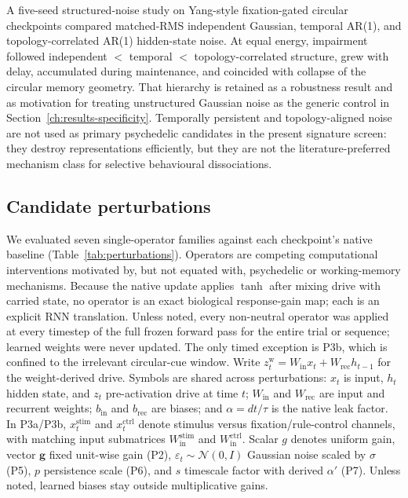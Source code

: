 A five-seed structured-noise study on Yang-style fixation-gated circular
checkpoints compared matched-RMS independent Gaussian, temporal AR(1), and
topology-correlated AR(1) hidden-state noise. At equal energy, impairment
followed independent $<$ temporal $<$ topology-correlated structure, grew with
delay, accumulated during maintenance, and coincided with collapse of the
circular memory geometry. That hierarchy is retained as a robustness result
and as motivation for treating unstructured Gaussian noise as the generic
control in Section~\ref{ch:results-specificity}. Temporally persistent and
topology-aligned noise are not used as primary psychedelic candidates in the
present signature screen: they destroy representations efficiently, but they
are not the literature-preferred mechanism class for selective behavioural
dissociations.

\subsection{Candidate perturbations}

We evaluated seven single-operator families against each checkpoint's native
baseline (Table~\ref{tab:perturbations}). Operators are competing computational
interventions motivated by, but not equated with, psychedelic or working-memory
mechanisms. Because the native update applies $\tanh$ after mixing drive with
carried state, no operator is an exact biological response-gain map; each is an
explicit RNN translation. Unless noted, every non-neutral operator was applied
at every timestep of the full frozen forward pass for the entire trial or
sequence; learned weights were never updated. The only timed exception is P3b,
which is confined to the irrelevant circular-cue window. Write
$z_t^{\mathrm{w}}=W_{\mathrm{in}}x_t+W_{\mathrm{rec}}h_{t-1}$ for the
weight-derived drive. Symbols are shared across perturbations:
$x_t$ is input, $h_t$ hidden state, and $z_t$ pre-activation drive at time
$t$; $W_{\mathrm{in}}$ and $W_{\mathrm{rec}}$ are input and recurrent weights;
$b_{\mathrm{in}}$ and $b_{\mathrm{rec}}$ are biases; and $\alpha=dt/\tau$ is
the native leak factor. In P3a/P3b, $x_t^{\mathrm{stim}}$ and
$x_t^{\mathrm{ctrl}}$ denote stimulus versus fixation/rule-control channels,
with matching input submatrices $W_{\mathrm{in}}^{\mathrm{stim}}$ and
$W_{\mathrm{in}}^{\mathrm{ctrl}}$. Scalar $g$ denotes uniform gain, vector
$\mathbf{g}$ fixed unit-wise gain (P2), $\varepsilon_t\sim\mathcal{N}(0,I)$
Gaussian noise scaled by $\sigma$ (P5), $p$ persistence scale (P6), and $s$
timescale factor with derived $\alpha'$ (P7). Unless noted, learned biases
stay outside multiplicative gains.

